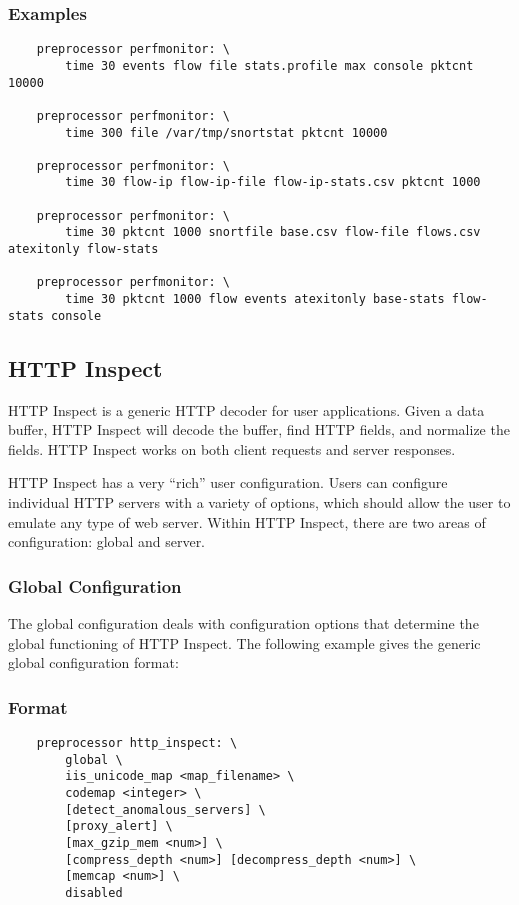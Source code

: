 \documentclass[english]{report}
\begin{document}
\subsubsection{Examples}

\begin{verbatim}
    preprocessor perfmonitor: \
        time 30 events flow file stats.profile max console pktcnt 10000 

    preprocessor perfmonitor: \
        time 300 file /var/tmp/snortstat pktcnt 10000

    preprocessor perfmonitor: \
        time 30 flow-ip flow-ip-file flow-ip-stats.csv pktcnt 1000

    preprocessor perfmonitor: \
        time 30 pktcnt 1000 snortfile base.csv flow-file flows.csv atexitonly flow-stats

    preprocessor perfmonitor: \
        time 30 pktcnt 1000 flow events atexitonly base-stats flow-stats console
\end{verbatim}

\subsection{HTTP Inspect}
\label{sub:http-inspect}

HTTP Inspect is a generic HTTP decoder for user applications.  Given a data
buffer, HTTP Inspect will decode the buffer, find HTTP fields, and normalize
the fields.  HTTP Inspect works on both client requests and server responses.

HTTP Inspect has a very ``rich'' user configuration.  Users can configure
individual HTTP servers with a variety of options, which should allow the user
to emulate any type of web server. Within HTTP Inspect, there are two areas of
configuration: global and server.

\subsubsection{Global Configuration}

The global configuration deals with configuration options that determine the
global functioning of HTTP Inspect.  The following example gives the generic
global configuration format:

\subsubsection{Format}
\begin{verbatim}
    preprocessor http_inspect: \
        global \
        iis_unicode_map <map_filename> \
        codemap <integer> \
        [detect_anomalous_servers] \
        [proxy_alert] \
        [max_gzip_mem <num>] \
        [compress_depth <num>] [decompress_depth <num>] \
        [memcap <num>] \
        disabled
\end{verbatim}
\end{document}
